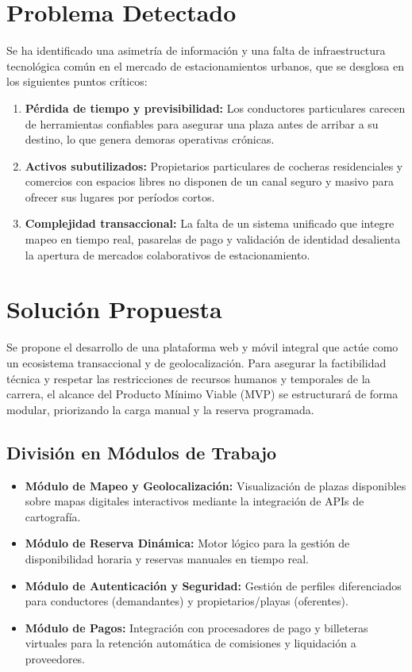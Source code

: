 \documentclass[11pt, a4paper]{article}
\begin{document}
\section{Problema Detectado}
Se ha identificado una asimetría de información y una falta de infraestructura tecnológica común en el mercado de estacionamientos urbanos, que se desglosa en los siguientes puntos críticos:

\begin{enumerate}
    \item \textbf{Pérdida de tiempo y previsibilidad:} Los conductores particulares carecen de herramientas confiables para asegurar una plaza antes de arribar a su destino, lo que genera demoras operativas crónicas.
    \item \textbf{Activos subutilizados:} Propietarios particulares de cocheras residenciales y comercios con espacios libres no disponen de un canal seguro y masivo para ofrecer sus lugares por períodos cortos.
    \item \textbf{Complejidad transaccional:} La falta de un sistema unificado que integre mapeo en tiempo real, pasarelas de pago y validación de identidad desalienta la apertura de mercados colaborativos de estacionamiento.
\end{enumerate}


\section{Solución Propuesta}
Se propone el desarrollo de una plataforma web y móvil integral que actúe como un ecosistema transaccional y de geolocalización. Para asegurar la factibilidad técnica y respetar las restricciones de recursos humanos y temporales de la carrera, el alcance del Producto Mínimo Viable (MVP) se estructurará de forma modular, priorizando la carga manual y la reserva programada.

\subsection{División en Módulos de Trabajo}
\begin{itemize}
    \item \textbf{Módulo de Mapeo y Geolocalización:} Visualización de plazas disponibles sobre mapas digitales interactivos mediante la integración de APIs de cartografía.
    \item \textbf{Módulo de Reserva Dinámica:} Motor lógico para la gestión de disponibilidad horaria y reservas manuales en tiempo real.
    \item \textbf{Módulo de Autenticación y Seguridad:} Gestión de perfiles diferenciados para conductores (demandantes) y propietarios/playas (oferentes).
    \item \textbf{Módulo de Pagos:} Integración con procesadores de pago y billeteras virtuales para la retención automática de comisiones y liquidación a proveedores.
\end{itemize}
\end{document}
